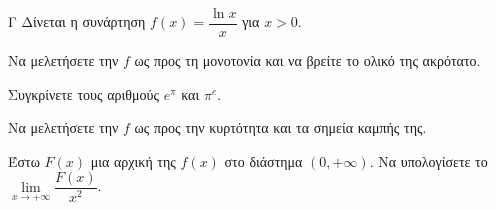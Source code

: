 \begin{thema}{Γ}
Δίνεται η συνάρτηση $f(x) = \dfrac{\ln x}{x}$ για $x > 0$.
\begin{erwthma}
  \item Να μελετήσετε την $f$ ως προς τη μονοτονία και να βρείτε το ολικό της ακρότατο.
  \item Συγκρίνετε τους αριθμούς $e^\pi$ και $\pi^e$.
  \item Να μελετήσετε την $f$ ως προς την κυρτότητα και τα σημεία καμπής της.
  \item Έστω $F(x)$ μια αρχική της $f(x)$ στο διάστημα $(0, +\infty)$. Να υπολογίσετε το $\lim\limits_{x \to +\infty} \dfrac{F(x)}{x^2}$.
\end{erwthma}
\end{thema}
